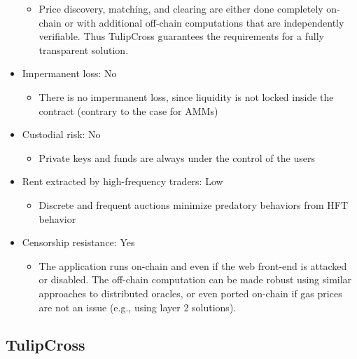 \documentclass[11pt, reqno]{amsart}
\theoremstyle{definition}
\theoremstyle{remark}
\begin{document}
\begin{itemize}
          \begin{itemize}
              \item Price discovery, matching, and clearing are either done
                    completely on-chain or with additional off-chain computations that are
                    independently verifiable. Thus TulipCross guarantees the requirements
                    for a fully transparent solution.
          \end{itemize}
    \item Impermanent loss: No
          \begin{itemize}
              \item There is no impermanent loss, since liquidity is not locked inside
                    the contract (contrary to the case for AMMs)
          \end{itemize}
    \item Custodial risk: No
          \begin{itemize}
              \item Private keys and funds are always under the control of the users
          \end{itemize}
    \item Rent extracted by high-frequency traders: Low
          \begin{itemize}
              \item Discrete and frequent auctions minimize predatory
                    behaviors from HFT behavior \cite{BuCrSh15}
          \end{itemize}
    \item Censorship resistance: Yes
          \begin{itemize}
              \item The application runs on-chain and even if the web front-end is attacked
                    or disabled. The off-chain computation can be made robust using similar
                    approaches to distributed oracles, or even ported on-chain if gas prices
                    are not an issue (e.g., using layer 2 solutions).
          \end{itemize}
\end{itemize}

\subsection{TulipCross}
\end{document}
